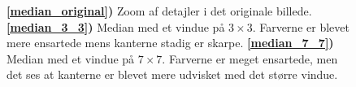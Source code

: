 {\begin{figure}[!h]
    \centering
    \hspace{1em}
    \hspace{1em}
    \caption[]{
        \textbf{\ref{median_original})} Zoom af detajler i det originale billede.
        \textbf{\ref{median_3_3})} Median med et vindue på $3\times{}3$.
        Farverne er blevet mere ensartede mens kanterne stadig er
        skarpe.
        \textbf{\ref{median_7_7})} Median med et vindue på $7\times{}7$. Farverne
        er meget ensartede, men det ses at kanterne er blevet mere
        udvisket med det større vindue.
    }
    \label{median_metode}
\end{figure}
}


